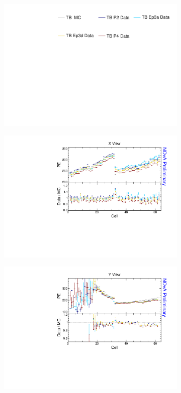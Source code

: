 \begin{figure}[!ht]
  \begin{subfigure}{\textwidth}
  \centering
    \includegraphics[height=0.2\linewidth]{essentialsec_tb/legend.pdf}
  \end{subfigure}
  \vspace*{2mm}

  \begin{subfigure}{0.495\textwidth}
    \includegraphics[width=\linewidth]{essentialsec_tb/pe_cell_x.pdf}
  \end{subfigure}
  \begin{subfigure}{0.495\textwidth}
    \includegraphics[width=\linewidth]{essentialsec_tb/pe_cell_y.pdf}

\end{subfigure}
\end{figure}
